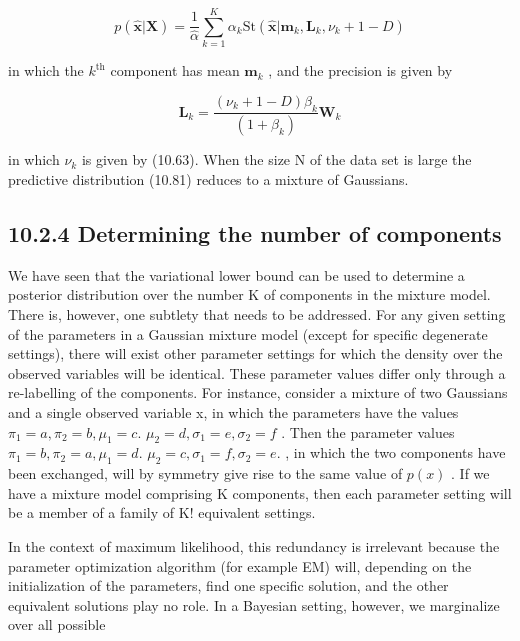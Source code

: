 \documentclass[
  10
]{article}
\begin{document}
\[
p (\widehat {\mathbf {x}} | \mathbf {X}) = \frac {1}{\widehat {\alpha}} \sum_ {k = 1} ^ {K} \alpha_ {k} \mathrm{St} (\widehat {\mathbf {x}} | \mathbf {m} _ {k}, \mathbf {L} _ {k}, \nu_ {k} + 1 - D)\tag{10.81}
\]

in which the \(k ^ { \mathrm { t h } }\) component has mean
\(\mathbf { m } _ { k }\) , and the precision is given by

\[
\mathbf {L} _ {k} = \frac {(\nu_ {k} + 1 - D) \beta_ {k}}{(1 + \beta_ {k})} \mathbf {W} _ {k}\tag{10.82}
\]

in which \(\nu _ { k }\) is given by (10.63). When the size N of the
data set is large the predictive distribution (10.81) reduces to a
mixture of Gaussians.

\subsection{10.2.4 Determining the number of
components}\label{determining-the-number-of-components}

We have seen that the variational lower bound can be used to determine a
posterior distribution over the number K of components in the mixture
model. There is, however, one subtlety that needs to be addressed. For
any given setting of the parameters in a Gaussian mixture model (except
for specific degenerate settings), there will exist other parameter
settings for which the density over the observed variables will be
identical. These parameter values differ only through a re-labelling of
the components. For instance, consider a mixture of two Gaussians and a
single observed variable x, in which the parameters have the values
\(\pi _ { 1 } = a , \pi _ { 2 } = b , \mu _ { 1 } = c .\)
\(\mu _ { 2 } = d , \sigma _ { 1 } = e , \sigma _ { 2 } = f\) . Then the
parameter values
\(\pi _ { 1 } = b , \pi _ { 2 } = a , \mu _ { 1 } = d .\)
\(\mu _ { 2 } = c , \sigma _ { 1 } = f , \sigma _ { 2 } = e .\) , in
which the two components have been exchanged, will by symmetry give rise
to the same value of \(p ( x )\) . If we have a mixture model comprising
K components, then each parameter setting will be a member of a family
of K! equivalent settings.

In the context of maximum likelihood, this redundancy is irrelevant
because the parameter optimization algorithm (for example EM) will,
depending on the initialization of the parameters, find one specific
solution, and the other equivalent solutions play no role. In a Bayesian
setting, however, we marginalize over all possible
\end{document}
